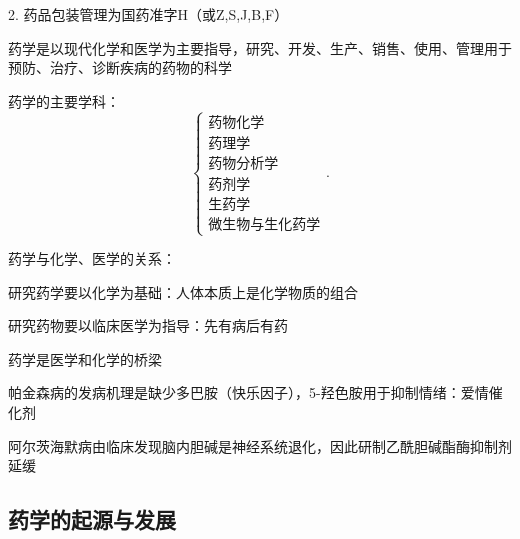 2. 药品包装管理为国药准字H（或Z,S,J,B,F）

\begin{notation}
    药学是以现代化学和医学为主要指导，研究、开发、生产、销售、使用、管理用于预防、治疗、诊断疾病的药物的科学
\end{notation}
药学的主要学科：
\[
    \begin{cases}
        \text{药物化学}\\ 
        \text{药理学}\\ 
        \text{药物分析学}\\ 
        \text{药剂学}\\ 
        \text{生药学}\\ 
        \text{微生物与生化药学}
    \end{cases}
.\] 
\begin{question}
药学与化学、医学的关系：
\end{question}
\begin{notation}
    研究药学要以化学为基础：人体本质上是化学物质的组合

    研究药物要以临床医学为指导：先有病后有药

    药学是医学和化学的桥梁
\end{notation}
\begin{eg}
    帕金森病的发病机理是缺少多巴胺（快乐因子），5-羟色胺用于抑制情绪：爱情催化剂
\end{eg}
\begin{eg}
    阿尔茨海默病由临床发现脑内胆碱是神经系统退化，因此研制乙酰胆碱酯酶抑制剂延缓
\end{eg}
\subsection{药学的起源与发展}%
\label{sub:药学的起源与发展}
